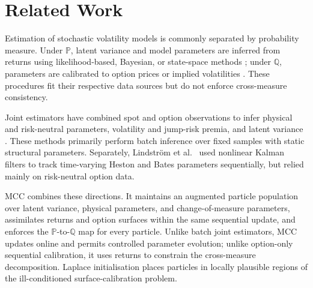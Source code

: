 \documentclass[sigconf,anonymous,review]{acmart}
\begin{document}




\section{Related Work}
\label{sec:related_work}
Estimation of stochastic volatility models is commonly separated by probability measure. Under \(\mathbb{P}\), latent variance and model
parameters are inferred from returns using likelihood-based, Bayesian, or state-space methods \cite{fruehwirth2008,andrieu2010particle,stramer2011bayesian}; under \(\mathbb{Q}\), parameters are calibrated to option prices or implied
volatilities \cite{cui2017full,mrazek2017calibration}. These procedures fit their respective data sources but do not enforce cross-measure consistency.

Joint estimators have combined spot and option observations to infer physical and risk-neutral parameters, volatility and jump-risk premia,
and latent variance
\cite{chernov2000joint,pan2002jump,forbes2007inference,
aihara2006filtering,hurn2015estimating}. These methods primarily perform batch inference over fixed samples with static structural parameters.
Separately, Lindstr\"om et al.\ \cite{lindstrom2008sequential} used nonlinear Kalman filters to track time-varying Heston and Bates parameters sequentially, but relied mainly on risk-neutral option data.

MCC combines these directions. It maintains an augmented particle population over latent variance, physical parameters, and
change-of-measure parameters, assimilates returns and option surfaces within the same sequential update, and enforces the
\(\mathbb{P}\)-to-\(\mathbb{Q}\) map for every particle. Unlike batch joint estimators, MCC updates online and permits controlled parameter
evolution; unlike option-only sequential calibration, it uses returns to constrain the cross-measure decomposition. Laplace initialisation places particles in locally plausible regions of the ill-conditioned
surface-calibration problem.
\end{document}
